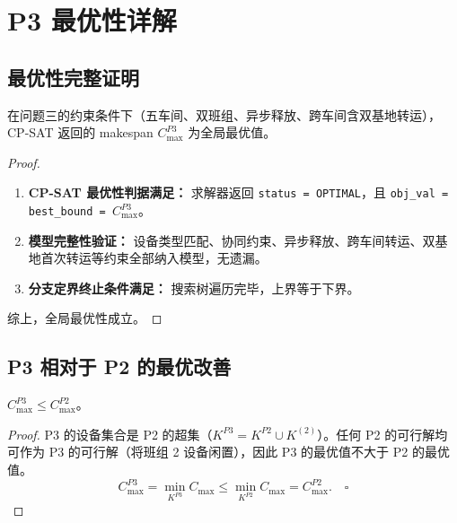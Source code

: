 \documentclass[UTF8,a4paper,12pt]{ctexart}
\begin{document}
\section{P3 最优性详解}
\subsection{最优性完整证明}
\begin{theorem}[P3 最优性]
在问题三的约束条件下（五车间、双班组、异步释放、跨车间含双基地转运），CP-SAT 返回的 makespan $C_{\max}^{P3}$ 为全局最优值。
\end{theorem}

\begin{proof}
\begin{enumerate}
  \item \textbf{CP-SAT 最优性判据满足：} 求解器返回 \texttt{status = OPTIMAL}，且 \texttt{obj\_val = best\_bound = $C_{\max}^{P3}$}。
  \item \textbf{模型完整性验证：} 设备类型匹配、协同约束、异步释放、跨车间转运、双基地首次转运等约束全部纳入模型，无遗漏。
  \item \textbf{分支定界终止条件满足：} 搜索树遍历完毕，上界等于下界。
\end{enumerate}
综上，全局最优性成立。
\end{proof}

\subsection{P3 相对于 P2 的最优改善}
\begin{proposition}[P3 的帕累托优势]
$C_{\max}^{P3} \leq C_{\max}^{P2}$。
\end{proposition}

\begin{proof}
P3 的设备集合是 P2 的超集（$K^{P3} = K^{P2} \cup K^{(2)}$）。任何 P2 的可行解均可作为 P3 的可行解（将班组 2 设备闲置），因此 P3 的最优值不大于 P2 的最优值。
\begin{equation}
C_{\max}^{P3} = \min_{K^{P3}} C_{\max} \leq \min_{K^{P2}} C_{\max} = C_{\max}^{P2}. \quad \square \tag{11-3}
\end{equation}
\end{proof}
\end{document}

